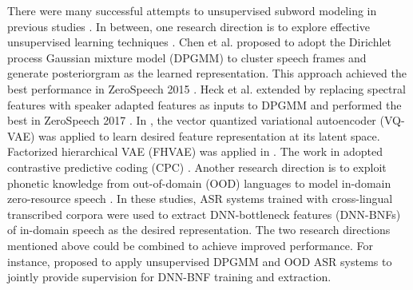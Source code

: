 \documentclass[a4paper]{article}
\begin{document}
There were many successful attempts to unsupervised subword modeling in previous studies \cite{chen2015parallel,heck2017feature,chorowski2019unsupervised,shibata2017composite,feng2019_TASLP,riviere2020unsupervised,Feng2019combining}. In between, one research direction is to explore effective unsupervised learning techniques 
\cite{chen2015parallel,heck2017feature,chorowski2019unsupervised}. Chen et al. \cite{chen2015parallel} proposed to adopt the Dirichlet process Gaussian mixture model (DPGMM) to cluster speech frames and generate posteriorgram as the learned  representation. This approach achieved the best performance in ZeroSpeech 2015 \cite{versteegh2015zero}. Heck et al. \cite{heck2017feature} extended \cite{chen2015parallel} by replacing spectral features with speaker adapted features as inputs to DPGMM and performed the best in ZeroSpeech 2017 \cite{heck2017feature}. 
In  \cite{chorowski2019unsupervised}, the vector quantized variational autoencoder (VQ-VAE) \cite{oord2017neural} was applied to learn desired feature representation at its latent space. Factorized hierarchical VAE (FHVAE) was applied in \cite{Feng2019improving}. 
The work in \cite{riviere2020unsupervised} adopted contrastive predictive coding (CPC) \cite{oord2018cpc}.
Another research direction is to exploit phonetic knowledge from out-of-domain (OOD) languages to model  in-domain zero-resource speech \cite{feng2019_TASLP,shibata2017composite}. In these studies, ASR systems trained with cross-lingual transcribed  corpora were used to extract  DNN-bottleneck features (DNN-BNFs) of in-domain speech as the desired representation.
The two research directions mentioned above could   be combined to  achieve improved performance. For instance, \cite{feng2019_TASLP} proposed 
to apply  unsupervised DPGMM  and OOD ASR systems to jointly provide supervision for DNN-BNF training and extraction. 
\end{document}
